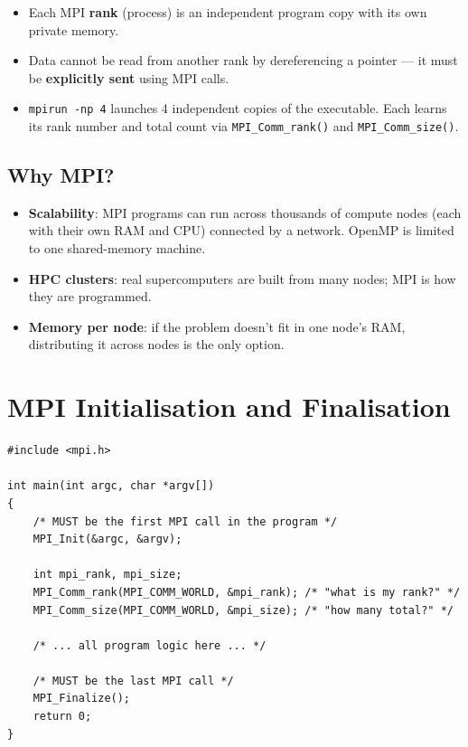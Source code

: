 \documentclass[12pt,a4paper]{article}
\begin{document}
\begin{itemize}
    \item Each MPI \textbf{rank} (process) is an independent program copy with
          its own private memory.
    \item Data cannot be read from another rank by dereferencing a pointer —
          it must be \textbf{explicitly sent} using MPI calls.
    \item \texttt{mpirun -np 4} launches 4 independent copies of the
          executable.  Each learns its rank number and total count via
          \texttt{MPI\_Comm\_rank()} and \texttt{MPI\_Comm\_size()}.
\end{itemize}

\subsection{Why MPI?}

\begin{itemize}
    \item \textbf{Scalability}: MPI programs can run across thousands of compute
          nodes (each with their own RAM and CPU) connected by a network.
          OpenMP is limited to one shared-memory machine.
    \item \textbf{HPC clusters}: real supercomputers are built from many nodes;
          MPI is how they are programmed.
    \item \textbf{Memory per node}: if the problem doesn't fit in one node's RAM,
          distributing it across nodes is the only option.
\end{itemize}

\section{MPI Initialisation and Finalisation}

\begin{lstlisting}
#include <mpi.h>

int main(int argc, char *argv[])
{
    /* MUST be the first MPI call in the program */
    MPI_Init(&argc, &argv);

    int mpi_rank, mpi_size;
    MPI_Comm_rank(MPI_COMM_WORLD, &mpi_rank); /* "what is my rank?" */
    MPI_Comm_size(MPI_COMM_WORLD, &mpi_size); /* "how many total?" */

    /* ... all program logic here ... */

    /* MUST be the last MPI call */
    MPI_Finalize();
    return 0;
}
\end{lstlisting}
\end{document}
